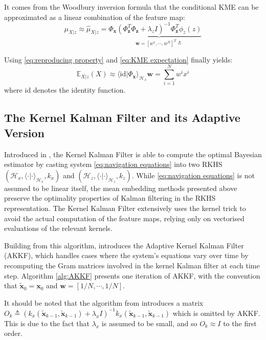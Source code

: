 \documentclass[conference]{IEEEtran}
\begin{document}
It comes from the Woodbury inversion formula that the conditional KME can be approximated as a linear combination of the feature map:
\begin{equation}
\mu_{X|z}\approx\hat{\mu}_{X|z}=\Phi_{\textbf{x}}\underbrace{(\Phi_{\textbf{z}}^T\Phi_{\textbf{z}}+\lambda_zI)^{-1}\Phi_{\textbf{z}}^T\phi_z(z)}_{\textbf{w}=[w^1,\cdots,w^N]^T\triangleq}
\end{equation}

Using \eqref{eq:reproducing property} and \eqref{eq:KME expectation} finally yields:
\begin{equation}
\mathbb{E}_{X|z}(X)\approx\langle\text{id}|\Phi_{\textbf{x}}\rangle_{\mathcal{H}_x}\textbf{w}=\sum_{i=1}^Nw^ix^i
\end{equation}
where $\text{id}$ denotes the identity function.

\subsection{The Kernel Kalman Filter and its Adaptive Version}

Introduced in \cite{bib:Kernel_Kalman}, the Kernel Kalman Filter is able to compute the optimal Bayesian estimator by casting system \eqref{eq:navigation equations} into two RKHS $(\mathcal{H}_x,\langle\cdot|\cdot\rangle_{\mathcal{H}_x},k_x)$ and $(\mathcal{H}_z,\langle\cdot|\cdot\rangle_{\mathcal{H}_z},k_z)$. While \eqref{eq:navigation equations} is not assumed to be linear itself, the mean embedding methods presented above preserve the optimality properties of Kalman filtering in the RKHS representation. The Kernel Kalman Filter extensively uses the kernel trick to avoid the actual computation of the feature maps, relying only on vectorised evaluations of the relevant kernels.

Building from this algorithm, \cite{bib:AKKF} introduces the Adaptive Kernel Kalman Filter (AKKF), which handles cases where the system's equations vary over time by recomputing the Gram matrices involved in the kernel Kalman filter at each time step. Algorithm \ref{alg:AKKF} presents one iteration of AKKF, with the convention that $\tilde{\textbf{x}}_0=\textbf{x}_0$ and $\textbf{w}=[1/N,\cdots,1/N]$.

It should be noted that the algorithm from \cite{bib:Kernel_Kalman} introduces a matrix $O_k\triangleq(k_x(\tilde{\textbf{x}}_{k-1},\tilde{\textbf{x}}_{k-1})+\lambda_xI)^{-1}k_x(\tilde{\textbf{x}}_{k-1},\tilde{\textbf{x}}_{k-1})$ which is omitted by AKKF. This is due to the fact that $\lambda_x$ is assumed to be small, and so $O_k\approx I$ to the first order.
\end{document}
